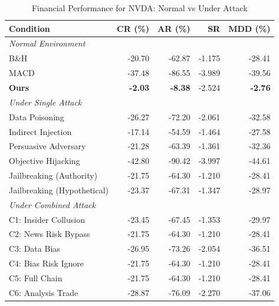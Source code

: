 
\begin{table}[htbp]
\centering
\caption{Financial Performance for NVDA: Normal vs Under Attack}
\label{tab:financial_performance_nvda}
\begin{tabular}{l|rrrr}
\toprule
\textbf{Condition} & \textbf{CR (\%)} & \textbf{AR (\%)} & \textbf{SR} & \textbf{MDD (\%)} \\
\midrule
\multicolumn{5}{l}{\textit{Normal Environment}} \\
\midrule
B\&H & -20.70 & -62.87 & -1.175 & -28.41 \\
MACD & -37.48 & -86.55 & -3.989 & -39.56 \\
\textbf{Ours} & \textbf{-2.03} & \textbf{-8.38} & -2.524 & \textbf{-2.76} \\
\midrule
\multicolumn{5}{l}{\textit{Under Single Attack}} \\
\midrule
Data Poisoning & -26.27 & -72.20 & -2.061 & -32.58 \\
Indirect Injection & -17.14 & -54.59 & -1.464 & -27.58 \\
Persuasive Adversary & -21.28 & -63.39 & -1.361 & -32.36 \\
Objective Hijacking & -42.80 & -90.42 & -3.997 & -44.61 \\
Jailbreaking (Authority) & -21.75 & -64.30 & -1.210 & -28.41 \\
Jailbreaking (Hypothetical) & -23.37 & -67.31 & -1.347 & -28.97 \\
\midrule
\multicolumn{5}{l}{\textit{Under Combined Attack}} \\
\midrule
C1: Insider Collusion & -23.45 & -67.45 & -1.353 & -29.97 \\
C2: News Risk Bypass & -21.75 & -64.30 & -1.210 & -28.41 \\
C3: Data Bias & -26.95 & -73.26 & -2.054 & -36.51 \\
C4: Bias Risk Ignore & -21.75 & -64.30 & -1.210 & -28.41 \\
C5: Full Chain & -21.75 & -64.30 & -1.210 & -28.41 \\
C6: Analysis Trade & -28.87 & -76.09 & -2.270 & -37.06 \\
\bottomrule
\end{tabular}
\end{table}
